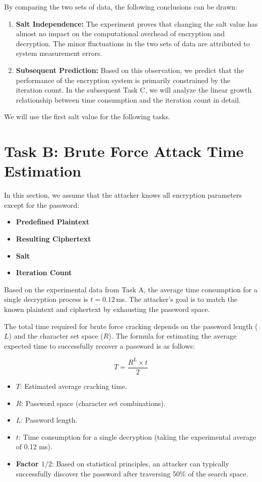 \documentclass[12pt,a4paper]{article}
\begin{document}
By comparing the two sets of data, the following conclusions can be drawn:

\begin{enumerate}
    \item \textbf{Salt Independence:} The experiment proves that changing the salt value has almost no impact on the computational overhead of encryption and decryption. The minor fluctuations in the two sets of data are attributed to system measurement errors.
    \item \textbf{Subsequent Prediction:} Based on this observation, we predict that the performance of the encryption system is primarily constrained by the iteration count. In the subsequent Task C, we will analyze the linear growth relationship between time consumption and the iteration count in detail.
\end{enumerate}

We will use the first salt value for the following tasks.

\section{Task B: Brute Force Attack Time Estimation}

In this section, we assume that the attacker knows all encryption parameters except for the password:

\begin{itemize}
    \item \textbf{Predefined Plaintext}
    \item \textbf{Resulting Ciphertext}
    \item \textbf{Salt}
    \item \textbf{Iteration Count}
\end{itemize}

Based on the experimental data from Task A, the average time consumption for a single decryption process is $t=0.12$\,ms. The attacker's goal is to match the known plaintext and ciphertext by exhausting the password space.

The total time required for brute force cracking depends on the password length ($L$) and the character set space ($R$). The formula for estimating the average expected time to successfully recover a password is as follows:

\begin{equation}
T = \frac{R^L \times t}{2}
\end{equation}

\begin{itemize}
    \item \textbf{$T$}: Estimated average cracking time.
    \item \textbf{$R$}: Password space (character set combinations).
    \item \textbf{$L$}: Password length.
    \item \textbf{$t$}: Time consumption for a single decryption (taking the experimental average of 0.12 ms).
    \item \textbf{Factor $1/2$}: Based on statistical principles, an attacker can typically successfully discover the password after traversing 50\% of the search space.
\end{itemize}
\end{document}
